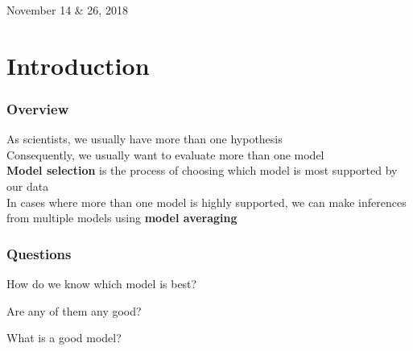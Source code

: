 \documentclass[color=usenames,dvipsnames]{beamer}\usepackage[]{graphicx}\usepackage[]{color}
\begin{document}



\begin{frame}[plain]
  \LARGE
  \centering \par
  {\color{NavyBlue}{ Model Selection and %
  Multimodel Inference \\}}
  \vspace{1cm}
  \large
  November 14 \& 26, 2018
\end{frame}


\section{Introduction}






\begin{frame}
  \frametitle{Overview}
  As scientists, we usually have more than one hypothesis \\
  \pause
  \vfill
  Consequently, we usually want to evaluate more than one model \\
  \pause
  \vfill
  {\bf Model selection} is the process of choosing which model is most
  supported by our data \\
  \pause
  \vfill
  In cases where more than one model is highly supported, we can make
  inferences from multiple models using {\bf model averaging} \\
\end{frame}



\begin{frame}
  \frametitle{Questions}
  \Large
  {How do we know which model is best? \par}
  \pause
  \vspace{0.9cm}
  { Are any of them any good? \par}
  \pause
  \vspace{0.9cm}
  {What is a good model? \par}
\end{frame}
\end{document}
